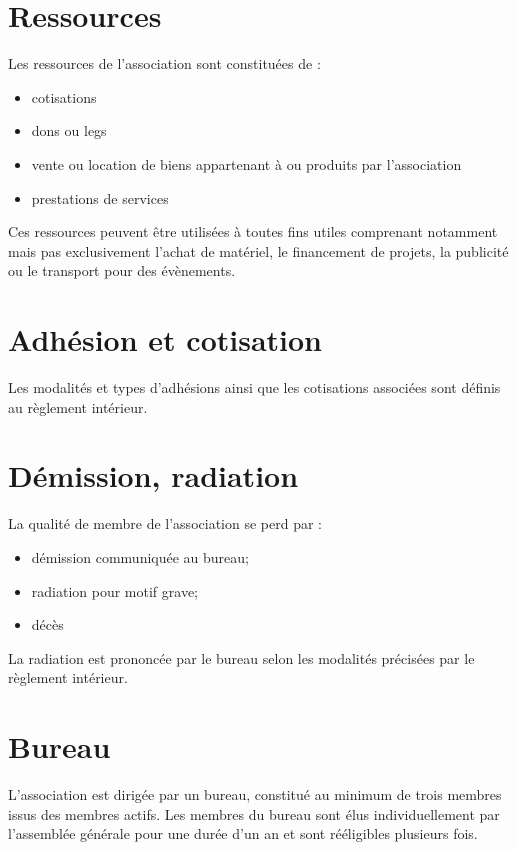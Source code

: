\documentclass[a4paper, 11pt]{article}
\begin{document}
\section{Ressources}

Les ressources de l'association sont constituées de :
\begin{itemize}
    \item cotisations
    \item dons ou legs
    \item vente ou location de biens appartenant à ou produits par l'association
    \item prestations de services
\end{itemize}

Ces ressources peuvent être utilisées à toutes fins utiles comprenant notamment mais pas exclusivement l'achat de
matériel, le financement de projets, la publicité ou le transport pour des évènements.


\section{Adhésion et cotisation} %

Les modalités et types d'adhésions ainsi que les cotisations associées sont définis au règlement intérieur.


\section{Démission, radiation} %

La qualité de membre de l'association se perd par :

\begin{itemize}
    \item démission communiquée au bureau;
    \item radiation pour motif grave;
    \item décès
\end{itemize}

La radiation est prononcée par le bureau selon les modalités précisées par le règlement intérieur.


\section{Bureau} %

L'association est dirigée par un bureau, constitué au minimum de trois membres issus des membres actifs.
Les membres du bureau sont élus individuellement par l'assemblée générale pour une durée d'un an et sont
rééligibles plusieurs fois.
\end{document}
